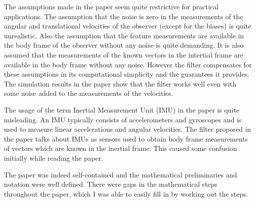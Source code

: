 \documentclass[12pt]{article}
\begin{document}
The assumptions made in the paper seem quite restrictive for practical applications.
The assumption that the noise is zero in the measurements of the angular and translational velocities of the observer (except for the biases) is quite unrealistic.
Also the assumption that the feature measurements are available in the body frame of the observer without any noise 
is quite demanding. It is also assumed that 
the measurements of the known vectors in the intertial frame are available in the body frame without any noise. 
However the filter compensates for these assumptions in its computational simplicity and the guarantees it provides.
The simulation results in the paper show that the filter works well even with some noise added to the measurements of the velocities.

The usage of the term Inertial Measurement Unit (IMU) in the paper is quite misleading. An IMU typically consists of accelerometers and gyroscopes and is used to measure linear accelerations and angular velocities.
The filter proposed in the paper talks about IMUs as sensors used to obtain body frame 
measurements of vectors which are known in the inertial frame. This caused some confusion 
initially while reading the paper.

The paper was indeed self-contained and the mathematical preliminaries and notation were well defined. There were 
gaps in the mathematical steps throughout the paper, which I was able to easily fill in by working out the steps.
\end{document}
